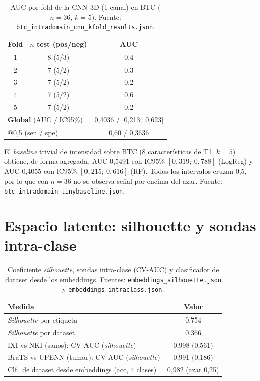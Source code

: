 \begin{table}[ht]
  \centering
  \caption[Detalle por fold de la CNN intra-dominio]{AUC por fold de la CNN 3D
  (1 canal) en BTC ($n=36$, $k=5$). Fuente:
  \texttt{btc\_intradomain\_cnn\_kfold\_results.json}.}
  \label{tab:apx_btc_fold}
  \begin{tabular}{c c c}
    \hline
    \textbf{Fold} & \textbf{$n$ test (pos/neg)} & \textbf{AUC} \\
    \hline
    1 & 8 (5/3) & 0,4 \\
    2 & 7 (5/2) & 0,3 \\
    3 & 7 (5/2) & 0,2 \\
    4 & 7 (5/2) & 0,6 \\
    5 & 7 (5/2) & 0,2 \\
    \hline
    \multicolumn{2}{l}{\textbf{Global} (AUC / IC95\%)} & 0,4036 / [0,213;\ 0,623] \\
    \multicolumn{2}{l}{@0,5 (sen / spe)} & 0,60 / 0,3636 \\
    \hline
  \end{tabular}
\end{table}

El \emph{baseline} trivial de intensidad sobre BTC (8 características de T1, $k=5$)
obtiene, de forma agregada, AUC 0,5491 con IC95\% $[0,319;\ 0,788]$ (LogReg) y
AUC 0,4055 con IC95\% $[0,215;\ 0,616]$ (RF). Todos los intervalos cruzan 0,5, por
lo que con $n=36$ no se observa señal por encima del azar. Fuente:
\texttt{btc\_intradomain\_tinybaseline.json}.

\section{Espacio latente: silhouette y sondas intra-clase}

\begin{table}[ht]
  \centering
  \caption[Análisis del espacio latente]{Coeficiente \emph{silhouette}, sondas
  intra-clase (CV-AUC) y clasificador de dataset desde los embeddings. Fuentes:
  \texttt{embeddings\_silhouette.json} y \texttt{embeddings\_intraclass.json}.}
  \label{tab:apx_emb}
  \begin{tabular}{l c}
    \hline
    \textbf{Medida} & \textbf{Valor} \\
    \hline
    \emph{Silhouette} por etiqueta            & 0,754 \\
    \emph{Silhouette} por dataset             & 0,366 \\
    IXI vs NKI (sanos): CV-AUC (\emph{silhouette}) & 0,998 (0,561) \\
    BraTS vs UPENN (tumor): CV-AUC (\emph{silhouette}) & 0,991 (0,186) \\
    Clf.\ de dataset desde embeddings (acc, 4 clases) & 0,982 (azar 0,25) \\
    \hline
  \end{tabular}
\end{table}

